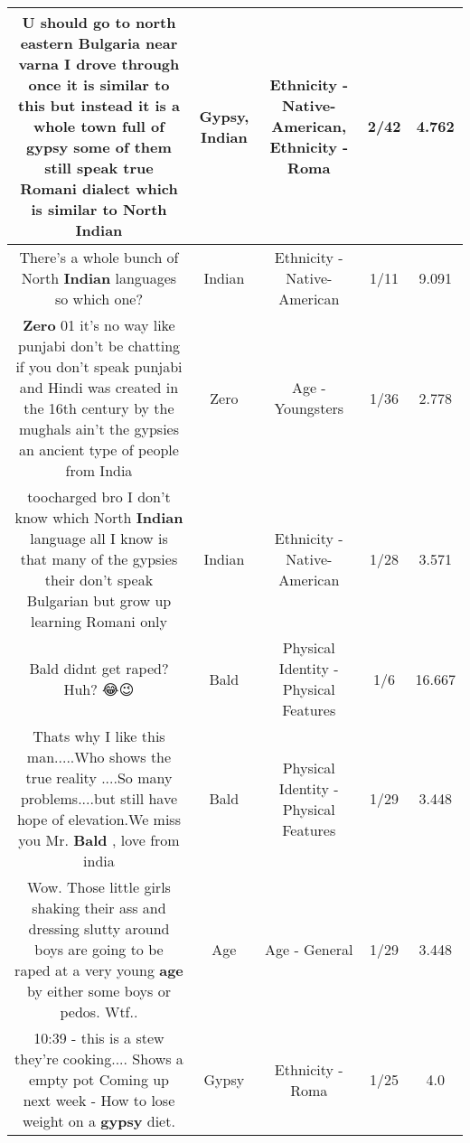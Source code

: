 \documentclass[11pt]{article}
\newlength\mylength
\begin{document}
\begin{center}
\begin{longtable}{|C{.65\mylength}|C{.30\mylength}|C{.12\mylength}|C{.12\mylength}|C{.12\mylength}|}
  \small U should go to north eastern Bulgaria near varna I drove through once it is similar to this but instead it is a whole town full of \textbf{gypsy} some of them still speak true Romani dialect which is similar to North Indian\normalsize   & Gypsy, Indian & Ethnicity - Native-American, Ethnicity - Roma & 2/42 & 4.762 \\  \hline
  \small There's a whole bunch of North \textbf{Indian} languages so which one?\normalsize   & Indian & Ethnicity - Native-American & 1/11 & 9.091 \\  \hline
  \small \@\textbf{Zero} 01 it's no way like punjabi don't be chatting if you don't speak punjabi and Hindi was created in the 16th century by the mughals ain't the gypsies an ancient type of people from India\normalsize   & Zero & Age - Youngsters & 1/36 & 2.778 \\  \hline
  \small toocharged bro I don't know which North \textbf{Indian} language all I know is that many of the gypsies their don't speak Bulgarian but grow up learning Romani only\normalsize   & Indian & Ethnicity - Native-American & 1/28 & 3.571 \\  \hline
  \small Bald didnt get raped? Huh? 😂😉\normalsize   & Bald & Physical Identity - Physical Features & 1/6 & 16.667 \\  \hline
  \small Thats why I like this man.....Who shows the true reality ....So many problems....but still have hope of elevation.We miss you Mr. \textbf{Bald} , love from india\normalsize   & Bald & Physical Identity - Physical Features & 1/29 & 3.448 \\  \hline
  \small Wow. Those little girls shaking their ass and dressing slutty around boys are going to be raped at a very young \textbf{age} by either some boys or pedos. Wtf..\normalsize   & Age & Age - General & 1/29 & 3.448 \\  \hline
  \small 10:39 -  this is a stew they're cooking....   Shows a empty pot Coming up next week - How to lose weight on a \textbf{gypsy} diet.\normalsize   & Gypsy & Ethnicity - Roma & 1/25 & 4.0 \\  \hline

\end{longtable}
\end{center}
\end{document}
